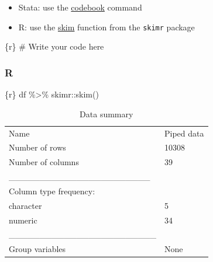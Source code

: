 \documentclass[
  letterpaper,
  DIV=11,
  numbers=noendperiod,
  oneside]{scrreprt}
\newenvironment{Shaded}{\begin{snugshade}}{\end{snugshade}}
\newcommand{\CommentTok}[1]{\textcolor[rgb]{0.37,0.37,0.37}{#1}}
\newcommand{\FunctionTok}[1]{\textcolor[rgb]{0.28,0.35,0.67}{#1}}
\newcommand{\InformationTok}[1]{\textcolor[rgb]{0.37,0.37,0.37}{#1}}
\newcommand{\NormalTok}[1]{\textcolor[rgb]{0.00,0.23,0.31}{#1}}
\newcommand{\SpecialCharTok}[1]{\textcolor[rgb]{0.37,0.37,0.37}{#1}}
\providecommand{\tightlist}{%
  \setlength{\itemsep}{0pt}\setlength{\parskip}{0pt}}\usepackage{longtable,booktabs,array}
\begin{document}
\begin{tcolorbox}[enhanced jigsaw, colbacktitle=quarto-callout-tip-color!10!white, titlerule=0mm, breakable, opacityback=0, opacitybacktitle=0.6, left=2mm, coltitle=black, colback=white, title=\textcolor{quarto-callout-tip-color}{\faLightbulb}\hspace{0.5em}{Tip}, rightrule=.15mm, colframe=quarto-callout-tip-color-frame, toprule=.15mm, bottomtitle=1mm, toptitle=1mm, arc=.35mm, bottomrule=.15mm, leftrule=.75mm]

\begin{itemize}
\tightlist
\item
  Stata: use the
  \href{https://www.stata.com/manuals/dcodebook.pdf}{codebook} command
\item
  R: use the
  \href{https://docs.ropensci.org/skimr/reference/skim.html}{skim}
  function from the \texttt{skimr} package
\end{itemize}

\end{tcolorbox}

\begin{Shaded}
\begin{Highlighting}[]
\InformationTok{\textasciigrave{}\textasciigrave{}\textasciigrave{}\{r\}}
\CommentTok{\# Write your code here}
\InformationTok{\textasciigrave{}\textasciigrave{}\textasciigrave{}}
\end{Highlighting}
\end{Shaded}

\hypertarget{r-16}{%
\subsubsection{R}\label{r-16}}

\begin{Shaded}
\begin{Highlighting}[]
\InformationTok{\textasciigrave{}\textasciigrave{}\textasciigrave{}\{r\}}
\NormalTok{df }\SpecialCharTok{\%\textgreater{}\%}
\NormalTok{  skimr}\SpecialCharTok{::}\FunctionTok{skim}\NormalTok{()}
\InformationTok{\textasciigrave{}\textasciigrave{}\textasciigrave{}}
\end{Highlighting}
\end{Shaded}

\begin{longtable}[]{@{}ll@{}}
\caption{Data summary}\tabularnewline
\toprule()
\endhead
Name & Piped data \\
Number of rows & 10308 \\
Number of columns & 39 \\
\_\_\_\_\_\_\_\_\_\_\_\_\_\_\_\_\_\_\_\_\_\_\_ & \\
Column type frequency: & \\
character & 5 \\
numeric & 34 \\
\_\_\_\_\_\_\_\_\_\_\_\_\_\_\_\_\_\_\_\_\_\_\_\_ & \\
Group variables & None \\
\bottomrule()
\end{longtable}
\end{document}
